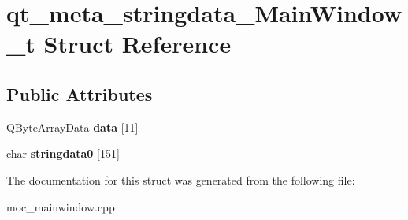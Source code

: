 \hypertarget{structqt__meta__stringdata__MainWindow__t}{}\section{qt\+\_\+meta\+\_\+stringdata\+\_\+\+Main\+Window\+\_\+t Struct Reference}
\label{structqt__meta__stringdata__MainWindow__t}
\subsection*{Public Attributes}
\begin{DoxyCompactItemize}
\item 
\mbox{\label{structqt__meta__stringdata__MainWindow__t_a194f1847aa339aa35f15ca1d192690f4}} 
Q\+Byte\+Array\+Data {\bfseries data} \mbox{[}11\mbox{]}
\item 
\mbox{\label{structqt__meta__stringdata__MainWindow__t_a0dda0c8a0c4d7efee1e511576f28d933}} 
char {\bfseries stringdata0} \mbox{[}151\mbox{]}
\end{DoxyCompactItemize}


The documentation for this struct was generated from the following file\+:\begin{DoxyCompactItemize}
\item 
moc\+\_\+mainwindow.\+cpp\end{DoxyCompactItemize}
